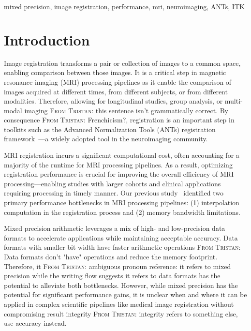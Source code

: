 \documentclass[journal,twoside,web]{ieeecolor}
\newcommand{\TG}[1]{\color{blue}\textsc{From Tristan: }#1\color{black}}
\begin{document}
\begin{IEEEkeywords}
	mixed precision, image registration, performance, mri, neuroimaging, ANTs, ITK
\end{IEEEkeywords}

\section{Introduction}
\label{sec:introduction}
Image registration transforms a pair or collection of images to a common space,
enabling comparison between those images. It is a critical step in magnetic
resonance imaging (MRI) processing pipelines as it enable the comparison of
images acquired at different times, from different subjects, or from different
modalities. Therefore, allowing for longitudinal studies, group analysis, or
multi-modal imaging \TG{this sentence isn't grammatically correct}. By
consequence \TG{Frenchicism?}, registration is an important step in toolkits such as the Advanced
Normalization Tools (ANTs) registration framework~\cite{Avants2020-xx}---a
widely adopted tool in the neuroimaging community.

MRI registration incurs a significant computational cost, often accounting for a majority of the runtime for MRI processing pipelines. As a result, optimizing registration performance is crucial for improving the overall efficiency of MRI processing---enabling studies with larger cohorts and clinical applications requiring processing in timely manner. Our previous study~\cite{Dugre2025-fs} identified two primary performance bottlenecks in MRI processing pipelines: (1) interpolation computation in the registration process and (2) memory bandwidth limitations.

Mixed precision arithmetic leverages a mix of high- and low-precision data
formats to accelerate applications while maintaining acceptable accuracy. Data
formats with smaller bit width have faster arithmetic operations \TG{Data
formats don't "have" operations} and reduce the memory footprint. Therefore, it
\TG{ambiguous pronoun reference: it refers to mixed precision while the writing
flow suggests it refers to data formats} has the potential to alleviate both
bottlenecks. However, while mixed precision has the potential for significant
performance gains, it is unclear when and where it can be applied in complex
scientific pipelines like medical image registration without compromising result
integrity \TG{integrity refers to something else, use accuracy instead}.
\end{document}
